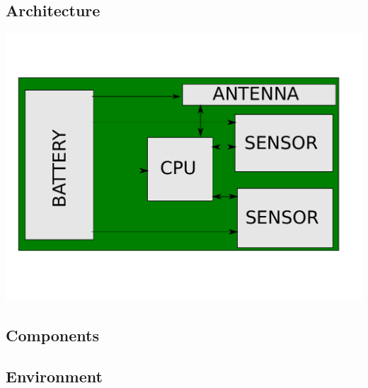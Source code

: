 \subsection{Architecture}
\begin{center}
	\includegraphics[scale=0.6]{img/board.pdf}
\end{center}
\subsection{Components}
\subsection{Environment}
